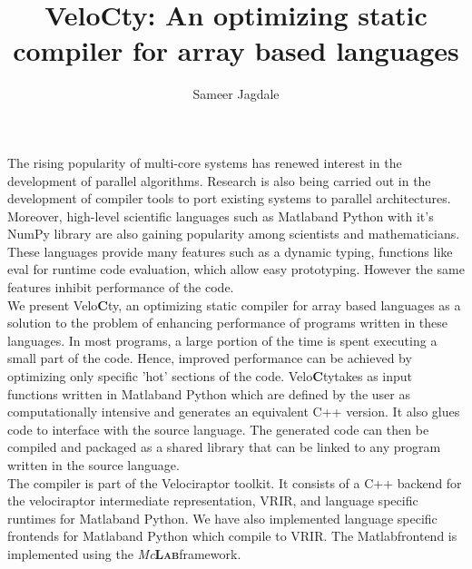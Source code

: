 \documentclass[a4paper, 12pt]{article}
\newcommand{\matlab}{{\textsc Matlab}\space}
\newcommand{\velocty}{{Velo\textbf{C}ty}\space}
\newcommand{\smclab}{\textrm{\textsl{Mc}\textbf{\textsc{Lab}}}}
\newcommand{\mclab}{\smclab\space}
\begin{document}
\title{\velocty : An optimizing static compiler for array based languages}
\author{Sameer Jagdale}
\maketitle
The rising popularity of multi-core systems has renewed interest in the development of parallel algorithms. Research is also being carried out in the development of compiler tools to port existing systems to parallel architectures. Moreover, high-level scientific languages such as \matlab and Python with it's NumPy library are also gaining popularity among scientists and mathematicians. These languages provide many features such as a dynamic typing, functions like eval for runtime code evaluation, which allow easy prototyping. However the same features inhibit performance of the code. \\
We present \velocty, an optimizing static compiler for array based languages as a solution to the problem of enhancing performance of programs written in these languages. In most programs, a large portion of the time is spent executing a small part of the code. Hence, improved performance can be achieved by optimizing only specific 'hot' sections of the code. \velocty takes as input functions written in \matlab and Python which are defined by the user as computationally intensive and generates an equivalent C++ version. It also glues code to interface with the source language. The generated code can then be compiled and packaged as a shared library that can be linked to any program written in the source language.\\
The compiler is part of the Velociraptor toolkit. It consists of a C++ backend for the velociraptor intermediate representation, VRIR, and language specific runtimes for \matlab and Python. We have also implemented language specific frontends for \matlab and Python which compile to VRIR. The \matlab frontend is implemented using the \mclab framework.
\end{document}
